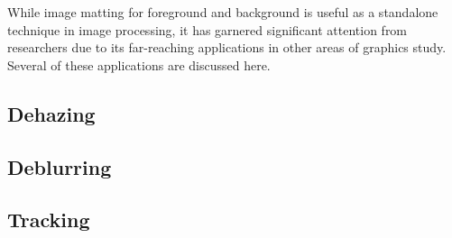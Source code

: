 While image matting for foreground and background is useful as a standalone technique in image processing, it has garnered significant attention from researchers due to its far-reaching applications in other areas of graphics study. Several of these applications are discussed here.

\subsection{Dehazing}

\subsection{Deblurring}

\subsection{Tracking}
